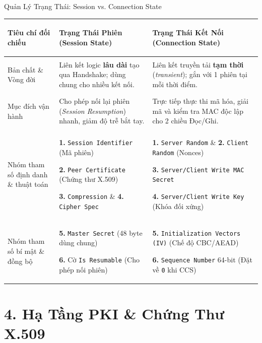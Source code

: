 \documentclass[aspectratio=169, 10pt]{beamer}
\begin{document}
\begin{frame}{Quản Lý Trạng Thái: Session vs. Connection State}
	\centering
	\fontsize{6.8pt}{8.8pt}\selectfont
	\renewcommand{\arraystretch}{1.16}
	\setlength{\tabcolsep}{5pt}
	\begin{tabularx}{\textwidth}{>{\leavevmode\color{uetblue}\bfseries\raggedright\arraybackslash}p{2.65cm} >{\raggedright\arraybackslash}X >{\raggedright\arraybackslash}X}
		\toprule
		\rowcolor{uetaccentbg}
		Tiêu chí đối chiếu & \textbf{\color{uetblue}Trạng Thái Phiên (Session State)} & \textbf{\color{uetblue}Trạng Thái Kết Nối (Connection State)} \\
		\midrule
		Bản chất \& Vòng đời & Liên kết logic \textbf{lâu dài} tạo qua Handshake; dùng chung cho nhiều kết nối. & Liên kết truyền tải \textbf{tạm thời} (\textit{transient}); gắn với 1 phiên tại mỗi thời điểm. \\
		\rowcolor{uetlightgray}
		Mục đích vận hành & Cho phép nối lại phiên (\textit{Session Resumption}) nhanh, giảm độ trễ bắt tay. & Trực tiếp thực thi mã hóa, giải mã và kiểm tra MAC độc lập cho 2 chiều Đọc/Ghi. \\
		Nhóm tham số định danh \& thuật toán & \textbf{1.} \texttt{Session Identifier} (Mã phiên)\par \textbf{2.} \texttt{Peer Certificate} (Chứng thư X.509)\par \textbf{3.} \texttt{Compression} \& \textbf{4.} \texttt{Cipher Spec} & \textbf{1.} \texttt{Server Random} \& \textbf{2.} \texttt{Client Random} (Nonces)\par \textbf{3.} \texttt{Server/Client Write MAC Secret}\par \textbf{4.} \texttt{Server/Client Write Key} (Khóa đối xứng) \\
		\rowcolor{uetlightgray}
		Nhóm tham số bí mật \& đồng bộ & \textbf{5.} \texttt{Master Secret} (48 byte dùng chung)\par \textbf{6.} Cờ \texttt{Is Resumable} (Cho phép nối phiên) & \textbf{5.} \texttt{Initialization Vectors (IV)} (Chế độ CBC/AEAD)\par \textbf{6.} \texttt{Sequence Number} 64-bit (Đặt về \texttt{0} khi CCS) \\
		\bottomrule
	\end{tabularx}
\end{frame}

\section{4. Hạ Tầng PKI \& Chứng Thư X.509}
\end{document}
